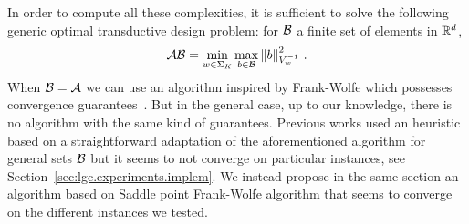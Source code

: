 
\begin{remark}
In order to compute all these complexities, it is sufficient to solve the following generic optimal transductive design problem: for $\mathcal{B}$ a finite set of elements in $\mathbb{R}^d$,
\[
\mathcal{A}\mathcal{B}=\min_{w\in\Sigma_K}\max_{b\in\mathcal{B}}\left\lVert b\right\rVert^2_{V_w^{-1}}\,.
\]
When $\mathcal{B}=\mathcal{A}$ we can use an algorithm inspired by Frank-Wolfe \citep{frank1956algorithm} which possesses convergence guarantees~\citep{atwood1969optimal,ahipasaoglu2008fw}. But in the general case, up to our knowledge, there is no algorithm with the same kind of guarantees. Previous works used an heuristic based on a straightforward adaptation of the aforementioned algorithm for general sets $\mathcal{B}$ but it seems to not converge on particular instances, see Section~\ref{sec:lgc.experiments.implem}. We instead propose in the same section an algorithm based on Saddle point Frank-Wolfe algorithm that seems to converge on the different instances we tested.
\end{remark}

